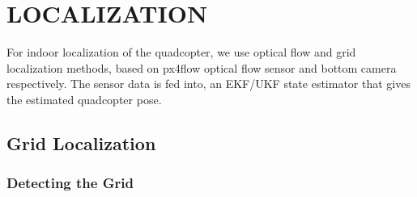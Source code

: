 \documentclass[12pt]{article}
\begin{document}
\section{LOCALIZATION}
For indoor localization of the quadcopter, we use optical flow and grid localization methods, 
based on px4flow optical flow sensor and bottom camera respectively. The sensor data is fed into, 
an EKF/UKF state estimator that gives the estimated quadcopter pose.

\subsection{Grid Localization}
\subsubsection{Detecting the Grid}
\end{document}
